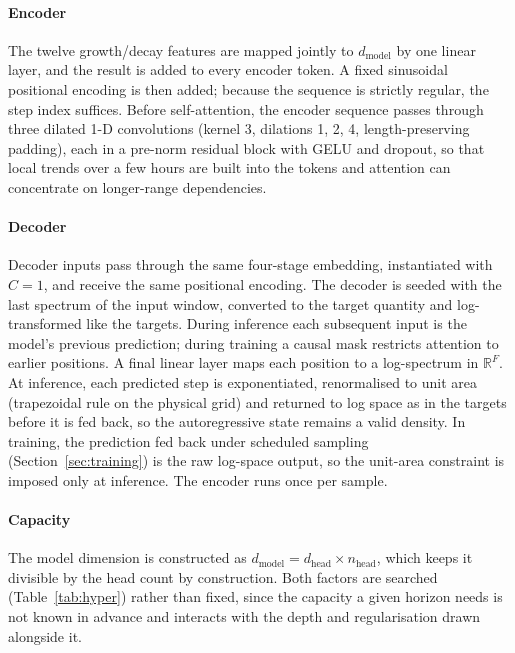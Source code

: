 \paragraph{Encoder}
The twelve growth/decay features are mapped jointly to $d_{\text{model}}$ by one linear layer, and the result is added to every encoder token. A fixed sinusoidal positional encoding \citep{vaswani2017attention} is then added; because the sequence is strictly regular, the step index suffices. Before self-attention, the encoder sequence passes through three dilated 1-D convolutions (kernel 3, dilations 1, 2, 4, length-preserving padding), each in a pre-norm residual block with GELU and dropout, so that local trends over a few hours are built into the tokens and attention can concentrate on longer-range dependencies.

\paragraph{Decoder}
Decoder inputs pass through the same four-stage embedding, instantiated with $C=1$, and receive the same positional encoding. The decoder is seeded with the last spectrum of the input window, converted to the target quantity and log-transformed like the targets. During inference each subsequent input is the model's previous prediction; during training a causal mask restricts attention to earlier positions. A final linear layer maps each position to a log-spectrum in $\mathbb{R}^F$. At inference, each predicted step is exponentiated, renormalised to unit area (trapezoidal rule on the physical grid) and returned to log space as in the targets before it is fed back, so the autoregressive state remains a valid density. In training, the prediction fed back under scheduled sampling (Section~\ref{sec:training}) is the raw log-space output, so the unit-area constraint is imposed only at inference. The encoder runs once per sample.

\paragraph{Capacity}
The model dimension is constructed as $d_{\text{model}} = d_{\text{head}} \times n_{\text{head}}$, which keeps it divisible by the head count by construction. Both factors are searched (Table~\ref{tab:hyper}) rather than fixed, since the capacity a given horizon needs is not known in advance and interacts with the depth and regularisation drawn alongside it.

